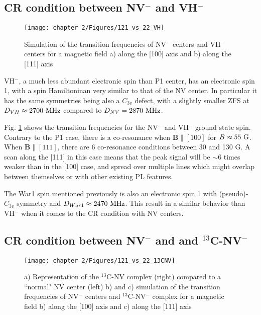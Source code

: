 \documentclass[a4paper, 11pt]{report}
\begin{document}
\subsection{CR condition between NV$^-$ and VH$^-$}

\begin{figure}[h]
\centering
\texttt{[image: chapter 2/Figures/121\_vs\_22\_VH]}
\caption{Simulation of the transition frequencies of NV$^-$ centers and VH$^-$ centers for a magnetic field a) along the [100] axis and b) along the [111] axis}
\label{121 vs 22 VH}
\end{figure}

VH$^-$, a much less abundant electronic spin than P1 center, has an electronic spin 1, with a spin Hamiltoninan very similar to that of the NV center. In particular it has the same symmetries being also a $C_{3v}$ defect, with a slightly smaller ZFS at $D_{VH} \approx 2700\ \rm MHz$ compared to $D_{NV}=2870\ \rm MHz$. 

Fig. \ref{121 vs 22 VH} shows the transition frequencies for the NV$^-$ and VH$^-$ ground state spin. Contrary to the P1 case, there is a co-resonance when $\mathbf{B} \parallel [100]$ for $B\approx 55\ \rm G$. When $\mathbf{B} \parallel [111]$, there are 6 co-resonance conditions between 30 and 130 G. A scan along the [111] in this case means that the peak signal will be $\sim 6$ times weaker than in the [100] case, and spread over multiple lines which might overlap between themselves or with other existing PL features.

The War1 spin mentioned previously is also an electronic spin 1 with (pseudo)-$C_{3v}$ symmetry and $D_{War1} \approx 2470\ \rm MHz$. This result in a similar behavior than VH$^-$ when it comes to the CR condition with NV centers.

\subsection{CR condition between NV$^-$ and and $^{13}$C-NV$^-$}
\label{sec NV-13c-NV}

\begin{figure}[h]
\centering
\texttt{[image: chapter 2/Figures/121\_vs\_22\_13CNV]}
\caption{a) Representation of the $^{13}$C-NV complex (right) compared to a ``normal" NV center (left) b) and c) simulation of the transition frequencies of NV$^-$ centers and $^{13}$C-NV$^-$ complex for a magnetic field b) along the [100] axis and c) along the [111] axis}
\label{121 vs 22 13C-NV}
\end{figure}
\end{document}
